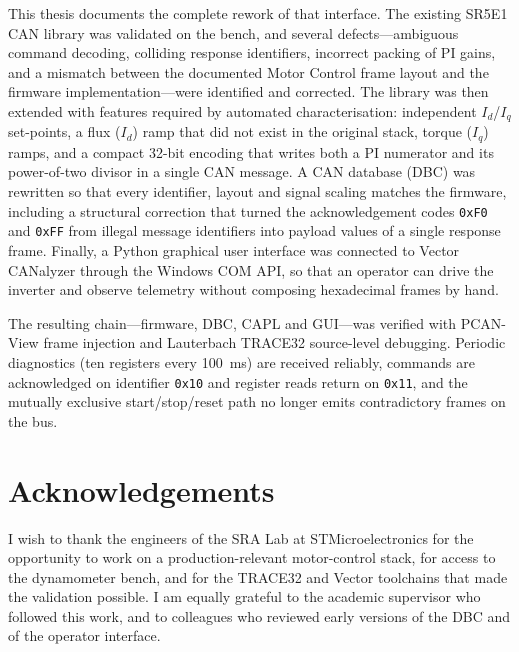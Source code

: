 \documentclass[11pt,a4paper,oneside,openany]{book}
\theoremstyle{definition}
\begin{document}
This thesis documents the complete rework of that interface. The existing
SR5E1 CAN library was validated on the bench, and several defects---ambiguous
command decoding, colliding response identifiers, incorrect packing of PI
gains, and a mismatch between the documented Motor Control frame layout and
the firmware implementation---were identified and corrected. The library was
then extended with features required by automated characterisation:
independent $I_d$/$I_q$ set-points, a flux ($I_d$) ramp that did not exist in
the original stack, torque ($I_q$) ramps, and a compact 32-bit encoding that
writes both a PI numerator and its power-of-two divisor in a single CAN
message. A CAN database (DBC) was rewritten so that every identifier, layout
and signal scaling matches the firmware, including a structural correction
that turned the acknowledgement codes \texttt{0xF0} and \texttt{0xFF} from
illegal message identifiers into payload values of a single response frame.
Finally, a Python graphical user interface was connected to Vector CANalyzer
through the Windows COM API, so that an operator can drive the inverter and
observe telemetry without composing hexadecimal frames by hand.

The resulting chain---firmware, DBC, CAPL and GUI---was verified with
PCAN-View frame injection and Lauterbach TRACE32 source-level debugging.
Periodic diagnostics (ten registers every \SI{100}{\milli\second}) are
received reliably, commands are acknowledged on identifier \texttt{0x10} and
register reads return on \texttt{0x11}, and the mutually exclusive
start/stop/reset path no longer emits contradictory frames on the bus.

\chapter*{Acknowledgements}
I wish to thank the engineers of the SRA Lab at STMicroelectronics for the
opportunity to work on a production-relevant motor-control stack, for access
to the dynamometer bench, and for the TRACE32 and Vector toolchains that made
the validation possible. I am equally grateful to the academic supervisor who
followed this work, and to colleagues who reviewed early versions of the DBC
and of the operator interface.
\end{document}
